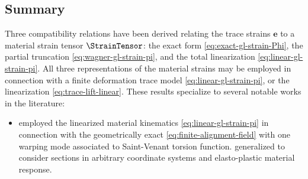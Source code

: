 \subsection{Summary}
Three compatibility relations have been derived relating the trace strains \(\bm{e}\) to a material strain tensor \(\StrainTensor\): the exact form \eqref{eq:exact-gl-strain-Phi}, the partial truncation \eqref{eq:wagner-gl-strain-pi}, and the total linearization \eqref{eq:linear-gl-strain-pi}. 
All three representations of the material strains may be employed in connection with a finite deformation trace model \eqref{eq:linear-gl-strain-pi}, or the linearization \eqref{eq:trace-lift-linear}.
These results specialize to several notable works in the literature:
\begin{itemize}
    \item \cite{simo1991geometricallyexact} employed the linearized material kinematics \eqref{eq:linear-gl-strain-pi} in connection with the geometrically exact \eqref{eq:finite-alignment-field} with one warping mode associated to Saint-Venant torsion function. \cite{gruttmann2000theory} generalized \cite{simo1991geometricallyexact} to consider sections in arbitrary coordinate systems and elasto-plastic material response.
\end{itemize}

